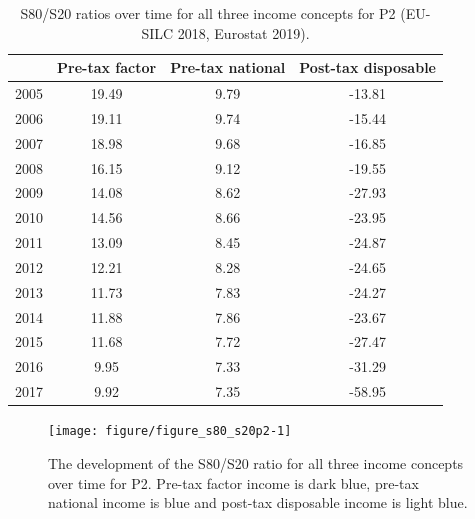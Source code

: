 \documentclass[a4paper]{article}\usepackage[]{graphicx}\usepackage[]{color}
\newenvironment{knitrout}{}{} %
\begin{document}
\begin{table}[ht]
\centering
\begin{tabular}{lccc}
  \toprule
 & Pre-tax factor & Pre-tax national & Post-tax disposable \\ 
  \midrule
2005 & 19.49 & 9.79 & -13.81 \\ 
  2006 & 19.11 & 9.74 & -15.44 \\ 
  2007 & 18.98 & 9.68 & -16.85 \\ 
  2008 & 16.15 & 9.12 & -19.55 \\ 
  2009 & 14.08 & 8.62 & -27.93 \\ 
  2010 & 14.56 & 8.66 & -23.95 \\ 
  2011 & 13.09 & 8.45 & -24.87 \\ 
  2012 & 12.21 & 8.28 & -24.65 \\ 
  2013 & 11.73 & 7.83 & -24.27 \\ 
  2014 & 11.88 & 7.86 & -23.67 \\ 
  2015 & 11.68 & 7.72 & -27.47 \\ 
  2016 & 9.95 & 7.33 & -31.29 \\ 
  2017 & 9.92 & 7.35 & -58.95 \\ 
   \bottomrule
\end{tabular}
\caption{S80/S20 ratios over time for all three income concepts for P2 (EU-SILC 2018, Eurostat 2019).} 
\label{s80_s20p2}
\end{table}


\begin{knitrout}
\color{fgcolor}\begin{figure}[H]

{\centering \texttt{[image: figure/figure\_s80\_s20p2-1]} 

}

\caption[The development of the S80/S20 ratio for all three income concepts over time for P2]{The development of the S80/S20 ratio for all three income concepts over time for P2. Pre-tax factor income is dark blue, pre-tax national income is blue and post-tax disposable income is light blue.}\label{fig:figure_s80_s20p2}
\end{figure}


\end{knitrout}
\end{document}
